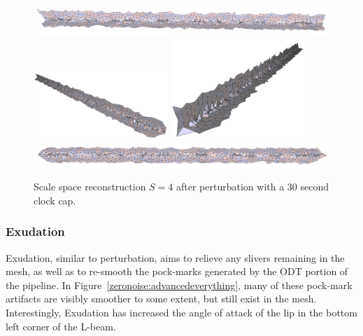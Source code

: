 \documentclass[12pt]{drexelthesis}
\let\Oldsubsubsection\subsubsection
\renewcommand{\subsubsection}{\FloatBarrier\Oldsubsubsection}
\begin{document}
\begin{figure}[!ht]
	\centering
		\includegraphics[width=5in]{simulated-lab-scan/0noise/optimizedNeat/scalespace4perturb00.png}
		\includegraphics[width=2in]{simulated-lab-scan/0noise/optimizedNeat/scalespace4perturb01.png}
		\includegraphics[width=2in]{simulated-lab-scan/0noise/optimizedNeat/scalespace4perturb02.png}
		\includegraphics[width=5in]{simulated-lab-scan/0noise/optimizedNeat/scalespace4perturb03.png}
		\caption[Scale space reconstruction $S = 4$ after perturbation with a 30 second clock cap]{\centering Scale space reconstruction $S = 4$ after perturbation with a 30 second clock cap.}
	\label{zeronoise:scalespace4perturb}
\end{figure}

\subsubsection{Exudation}

Exudation, similar to perturbation, aims to relieve any slivers remaining in the mesh, as well as to re-smooth the pock-marks generated by the ODT portion of the pipeline. In Figure~\ref{zeronoise:advancedeverything}, many of these pock-mark artifacts are visibly smoother to some extent, but still exist in the mesh. Interestingly, Exudation has increased the angle of attack of the lip in the bottom left corner of the L-beam. %
\end{document}
